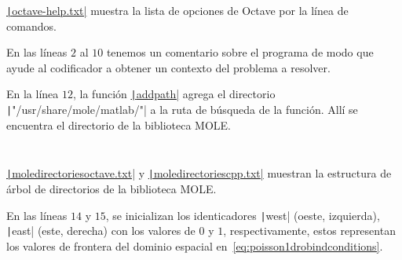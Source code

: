 \begin{problem}
\begin{listing}[ht!]
    \tiny
    \centering
    \inputminted{text}{octave-help.txt}
    \caption{\href{https://raw.githubusercontent.com/carlosal1015/mole_examples/refs/heads/main/homework/octave-help.txt}{\texttt|octave-help.txt|}
        muestra la lista de opciones de Octave por la línea de comandos.}
\end{listing}

En las líneas $2$ al $10$ tenemos un comentario sobre el programa de modo que
ayude al codificador a obtener un contexto del problema a resolver.



En la línea $12$, la función
\href{https://docs.octave.org/v9.3.0/Manipulating-the-Load-Path.html#index-addpath}{\texttt|addpath|}
agrega el directorio \texttt|"/usr/share/mole/matlab/"| a la ruta de búsqueda de la función.
Allí se encuentra el directorio de la biblioteca MOLE.

\begin{listing}[ht!]
    \tiny
    \centering
    \inputminted{text}{moledirectoriesoctave.txt}
    \inputminted{text}{moledirectoriescpp.txt}
    \caption{\href{https://raw.githubusercontent.com/carlosal1015/mole_examples/refs/heads/main/homework/moledirectoriesoctave.txt}{\texttt|moledirectoriesoctave.txt|}
        y \href{https://raw.githubusercontent.com/carlosal1015/mole_examples/refs/heads/main/homework/moledirectoriescpp.txt}{\texttt|moledirectoriescpp.txt|}
        muestran la estructura de árbol de directorios de la biblioteca MOLE.}
\end{listing}

En las líneas $14$ y $15$, se inicializan los identicadores
\texttt|west| (oeste, izquierda),
\texttt|east| (este, derecha) con los valores de $0$ y
$1$, respectivamente, estos representan los valores de frontera del
dominio espacial en~\eqref{eq:poisson1drobindconditions}.


\end{problem}
